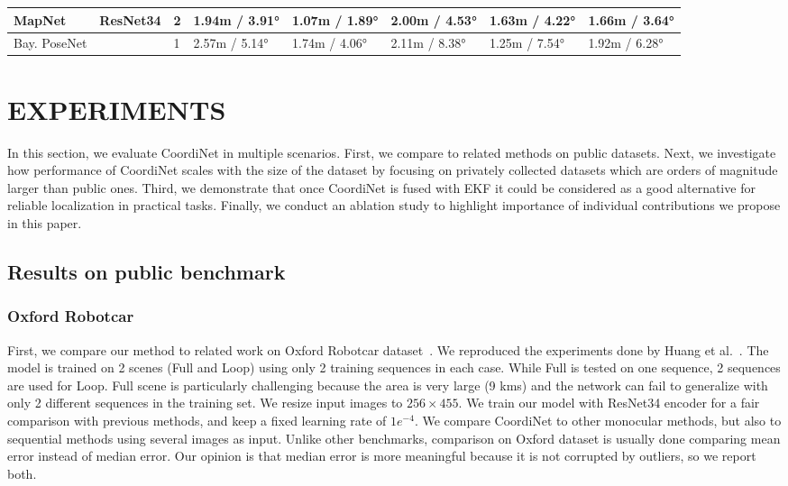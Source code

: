\documentclass[10pt,twocolumn,letterpaper]{article}
\begin{document}
\begin{table*}[!t]
\begin{tabular}{|l|l|l|l|l|l|l|l|}
MapNet             & ResNet34          & 2              & 1.94m / 3.91°                              & 1.07m / 1.89°                         & 2.00m / 4.53°                         & 1.63m / 4.22°                         & 1.66m / 3.64°                         \\ \hline
Bay. PoseNet       &                   & 1              & 2.57m / 5.14°                              & 1.74m / 4.06°                         & 2.11m / 8.38°                         & 1.25m / 7.54°                         & 1.92m / 6.28°                         \\ \hline
\end{tabular}
\end{table*} 
\section{EXPERIMENTS}
\label{sec:results}

In this section, we evaluate CoordiNet in multiple scenarios. First, we compare to related methods on public datasets. Next, we investigate how performance of CoordiNet scales with the size of the dataset by focusing on privately collected datasets which are orders of magnitude larger than public ones. Third, we demonstrate that once CoordiNet is fused with EKF it could be considered as a good alternative for reliable localization in practical tasks. Finally, we conduct an ablation study to highlight importance of individual contributions we propose in this paper.


\subsection{Results on public benchmark}

\subsubsection{Oxford Robotcar}

First, we compare our method to related work on Oxford Robotcar dataset~\cite{RobotCarDatasetIJRR}. We reproduced the experiments done by Huang et al.~\cite{RVL}. The model is trained on 2 scenes (Full and Loop) using only 2 training sequences in each case. While Full is tested on one sequence, 2 sequences are used for Loop. Full scene is particularly challenging because the area is very large (9 kms) and the network can fail to generalize with only 2 different sequences in the training set. We resize input images to $256 \times 455$. We train our model with ResNet34 encoder for a fair comparison with previous methods, and keep a fixed learning rate of $1e^{-4}$. We compare CoordiNet to other monocular methods, but also to sequential methods using several images as input. Unlike other benchmarks, comparison on Oxford dataset is usually done comparing mean error instead of median error. Our opinion is that median error is more meaningful because it is not corrupted by outliers, so we report both.
\end{document}
